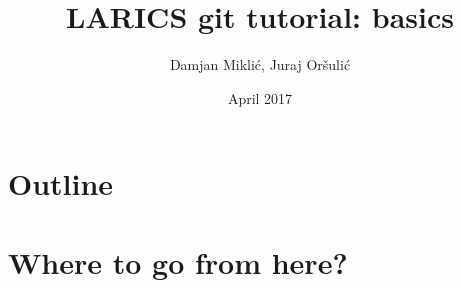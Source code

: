\documentclass[xcolor=dvipsnames]{beamer}%
\title[git basics]
{LARICS git tutorial: basics}
\author[Mikli\'{c}, Or\v{s}uli\'{c}]{Damjan Mikli\'{c}, Juraj Or\v{s}uli\'{c}}
\institute[LARICS]{LARICS Lab\\FER, University of Zagreb}
\date[]{April 2017}
\begin{document}

\begin{frame}
	\titlepage
\end{frame}

\section*{Outline}
\begin {frame}
	\tableofcontents
\end{frame}












\section{Where to go from here?}
\end{document}
